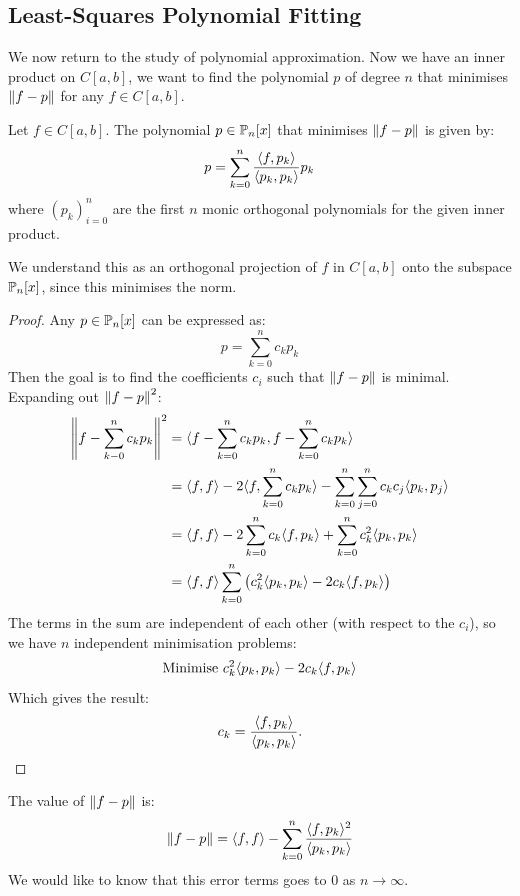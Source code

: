 \documentclass[../Main.tex]{subfiles}
\begin{document}
\subsection{Least-Squares Polynomial Fitting}
We now return to the study of polynomial approximation. Now we have an inner product on $C[a, b]$, we want to find the polynomial $p$ of degree $n$ that minimises $\norm{f - p}$ for any $f \in C[a, b]$.
\begin{theorem}
    Let $f \in C[a, b]$. The polynomial $p \in \P_n[x]$ that minimises $\norm{f - p}$ is given by:
    \begin{equation}
        p = \sum_{k=0}^{n} \frac{\inn{f}{p_k}}{\inn{p_k}{p_k}} p_k
        \label{eqnLeastSquaresPoly}
    \end{equation}
    where $(p_k)_{i=0}^n$ are the first $n$ monic orthogonal polynomials for the given inner product.
    \label{thmLeastSquaresPoly}
\end{theorem}
\begin{remark}
    We understand this as an orthogonal projection of $f$ in $C[a, b]$ onto the subspace $\P_n[x]$, since this minimises the norm.
\end{remark}
\begin{proof}
    Any $p \in \P_n[x]$ can be expressed as:
    \begin{equation*}
        p = \sum_{k=0}^{n} c_k p_k
    \end{equation*}
    Then the goal is to find the coefficients $c_i$ such that $\norm{f - p}$ is minimal. Expanding out $\norm{f - p}^2$:
    \begin{align*}
        \norm{f - \sum_{k-0}^{n} c_k p_k}^2 &= \inn{f - \sum_{k=0}^n c_k p_k}{f - \sum_{k=0}^n c_k p_k} \\
        &= \inn{f}{f} - 2 \inn{f}{\sum_{k=0}^{n} c_k p_k} - \sum_{k=0}^{n} \sum_{j=0}^{n} c_k c_j \inn{p_k}{p_j} \\
        &= \inn{f}{f} - 2 \sum_{k=0}^{n}c_k \inn{f}{p_k} + \sum_{k=0}^{n} c_k^2 \inn{p_k}{p_k} \\
        &= \inn{f}{f} \sum_{k=0}^{n}\left(c_k^2 \inn{p_k}{p_k} - 2 c_k \inn{f}{p_k}\right)
    \end{align*}
    The terms in the sum are independent of each other (with respect to the $c_i$), so we have $n$ independent minimisation problems:
    \begin{equation*}
        \text{Minimise } c_k^2 \inn{p_k}{p_k} - 2 c_k \inn{f}{p_k}
    \end{equation*}
    Which gives the result:
    \begin{equation*}
        c_k = \frac{\inn{f}{p_k}}{\inn{p_k}{p_k}}.
    \end{equation*}
\end{proof}
The value of $\norm{f - p}$ is:
\begin{equation*}
    \norm{f - p} = \inn{f}{f} - \sum_{k=0}^{n} \frac{\inn{f}{p_k}^2}{\inn{p_k}{p_k}}
\end{equation*}
We would like to know that this error terms goes to $0$ as $n \to \infty$.
\end{document}
